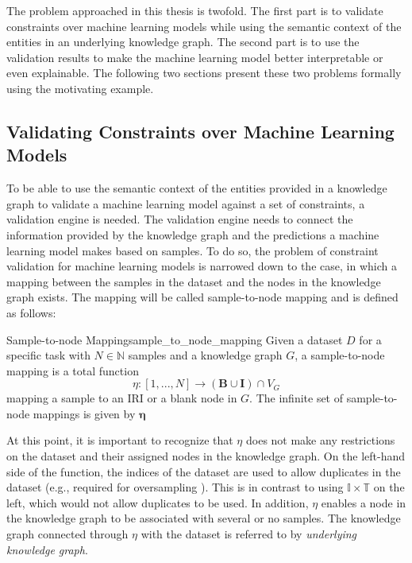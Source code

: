 
The problem approached in this thesis is twofold. The first part is to validate constraints over machine learning models while using the semantic context of the entities in an underlying knowledge graph. The second part is to use the validation results to make the machine learning model better interpretable or even explainable. The following two sections present these two problems formally using the motivating example.

\subsection{Validating Constraints over Machine Learning Models}
To be able to use the semantic context of the entities provided in a knowledge graph to validate a machine learning model against a set of constraints, a validation engine is needed. The validation engine needs to connect the information provided by the knowledge graph and the predictions a machine learning model makes based on samples. To do so, the problem of constraint validation for machine learning models is narrowed down to the case, in which a mapping between the samples in the dataset and the nodes in the knowledge graph exists. The mapping will be called sample-to-node mapping and is defined as follows:

\begin{Def}{Sample-to-node Mapping}{sample_to_node_mapping}
Given a dataset $D$ for a specific task with $N \in \mathbb{N}$ samples and a knowledge graph $G$, a sample-to-node mapping is a total function \[\eta: [1,...,N] \to (\mathbf{B} \cup \mathbf{I}) \cap V_G\] mapping a sample to an IRI or a blank node in $G$.
The infinite set of sample-to-node mappings is given by $\boldsymbol{\eta}$
\end{Def}

At this point, it is important to recognize that $\eta$ does not make any restrictions on the dataset and their assigned nodes in the knowledge graph. On the left-hand side of the function, the indices of the dataset are used to allow duplicates in the dataset (e.g., required for oversampling \cite{imblearn}). This is in contrast to using $\mathbb{I} \times \mathbb{T}$ on the left, which would not allow duplicates to be used.
In addition, $\eta$ enables a node in the knowledge graph to be associated with several or no samples.
The knowledge graph connected through $\eta$ with the dataset is referred to by \emph{underlying knowledge graph}.

